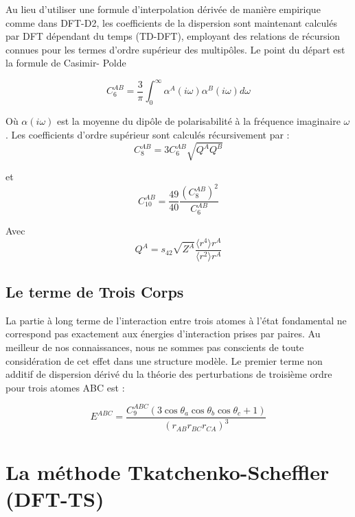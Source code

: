 	
	Au lieu d'utiliser une formule d'interpolation dérivée de manière empirique comme dans DFT-D2, les coefficients de la dispersion sont maintenant calculés par DFT dépendant du temps (TD-DFT), employant des relations de récursion connues pour les termes d'ordre supérieur des multipôles. Le point du départ est la formule de Casimir- Polde\cite{kaplan2006intermolecular} 
	
	\bigskip
	\begin{equation}
	C_{6}^{AB} = \frac{3}{\pi}\int_{0}^{\infty} \alpha^{A} (i\omega) \alpha^{B} (i\omega) d\omega
	\end{equation}
	\bigskip
	
	Où $\alpha(i\omega)$ est la moyenne du dipôle de polarisabilité à la fréquence imaginaire $\omega$. Les coefficients d'ordre supérieur sont calculés récursivement par :
	\bigskip
	\begin{equation}
	C_{8}^{AB} = 3C_{6}^{AB} \sqrt{Q^{A}Q^{B}}
	\end{equation}
	
	et \begin{equation}
	C_{10}^{AB} =\frac{49}{40} \frac{(C_{8}^{AB})^{2}}{C_{6}^{AB}}
	\end{equation}
	
	Avec
	\begin{equation}
	Q^{A} = s_{42}\sqrt{Z^{A}} \frac{\langle r^{4}\rangle r^{A}}{\langle r^{2}\rangle r^{A}}
	\end{equation}
	
	\bigskip
	\subsection{Le terme de Trois Corps}
	\bigskip
	
	La partie à long terme de l'interaction entre trois atomes à l'état fondamental ne correspond pas exactement aux énergies d'interaction prises par paires. Au meilleur de nos connaissances, nous ne sommes pas conscients de toute considération de cet effet dans une structure modèle. Le premier terme non additif de dispersion dérivé du
	la théorie des perturbations de troisième ordre pour trois atomes ABC est :
	
	\begin{equation}
	E^{ABC} = \frac{C_{9}^{ABC}(3\cos\theta_{a}\cos\theta_{b}\cos\theta_{c}+ 1)}{(r_{AB} r_{BC} r_{CA})^{3}}
	\end{equation}
	
	\bigskip
	\section{La méthode Tkatchenko-Scheffler (DFT-TS)}
	
